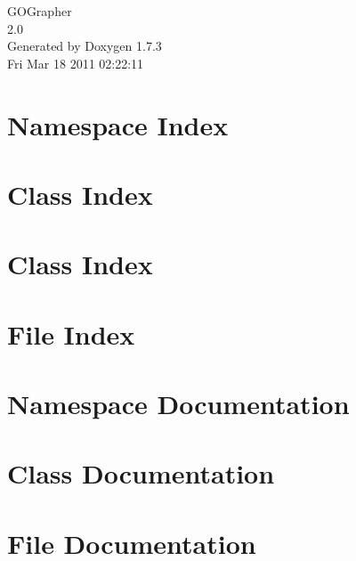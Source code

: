 \documentclass[a4paper]{book}
\begin{document}
\hypersetup{pageanchor=false}
\begin{titlepage}
\vspace*{7cm}
\begin{center}
{\Large GOGrapher \\[1ex]\large 2.0 }\\
\vspace*{1cm}
{\large Generated by Doxygen 1.7.3}\\
\vspace*{0.5cm}
{\small Fri Mar 18 2011 02:22:11}\\
\end{center}
\end{titlepage}
\clearemptydoublepage
{}
\tableofcontents
\clearemptydoublepage
{}
\hypersetup{pageanchor=true}
\chapter{Namespace Index}

\chapter{Class Index}

\chapter{Class Index}

\chapter{File Index}

\chapter{Namespace Documentation}







\chapter{Class Documentation}






\chapter{File Documentation}







\printindex
\end{document}
